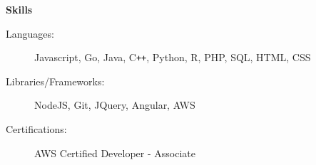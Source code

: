 \documentclass[letterpaper,11pt]{article}
\newcommand{\resheading}[1]{{\large \colorbox{mygrey}{\begin{minipage}{\textwidth}{\textbf{#1 \vphantom{p\^{E}}}}\end{minipage}}}}
\begin{document}
\begin{itemize}
\vspace{0.1in}
\end{itemize}

\resheading{Skills}

\begin{description}
\item[Languages:]
Javascript, Go, Java, C{}\verb!++!, Python, R, PHP, SQL, HTML, CSS
\item[Libraries/Frameworks:]
NodeJS, Git, JQuery, Angular,  AWS
\item[Certifications:]
AWS Certified Developer - Associate

\end{description}
\end{document}

